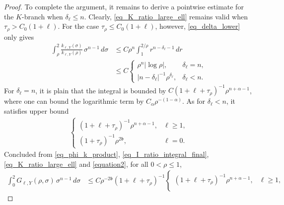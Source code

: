 \documentclass[12pt]{amsart}
\begin{document}
\begin{proof}
To complete the argument, it remains to derive a pointwise estimate for the $K$-branch when $\delta_\ell \le n$. Clearly, \eqref{eq_K_ratio_large_ell} remains valid when $\tau_\rho > C_0(1+\ell)$. For the case $\tau_\rho \le C_0(1+\ell)$, however, \eqref{eq_delta_lower} only gives
\begin{align*}
    \int_\rho^2 \frac{k_{\ell,Y}(\sigma)}{k_{\ell,Y}(\rho)} \, \sigma^{n-1} \, d\sigma
    &\le C \rho^n \int_1^{2/\rho} r^{n-\delta_\ell-1}\,dr\\
    &\le C \begin{cases}
        \rho^n |\log{\rho}|, & \delta_\ell = n,\\
        |n-\delta_\ell|^{-1} \rho^{\delta_\ell}, & \delta_\ell < n.
    \end{cases}
\end{align*}
For $\delta_\ell=n$, it is plain that the integral is bounded by $C(1+\ell+\tau_\rho)^{-1} \rho^{n+\alpha-1}$, where one can bound the logarithmic term by $C_\alpha \rho^{-(1-\alpha)}$. As for $\delta_\ell<n$, it satisfies upper bound
\begin{align}\label{equation2}
    \begin{cases}
        (1+\ell+\tau_\rho)^{-1} \rho^{n+\alpha-1}, & \ell \ge 1,\\
        (1+\tau_\rho)^{-1} \rho^{2\mathfrak b}, & \ell=0.
    \end{cases}
\end{align}
Concluded from \eqref{eq_phi_k_product}, \eqref{eq_I_ratio_integral_final}, \eqref{eq_K_ratio_large_ell} and \eqref{equation2}, for all $0<\rho \le 1$,
\begin{align*}
    \int_0^2
        G_{\ell,Y}(\rho,\sigma)
    \, \sigma^{n-1} \, d\sigma
    &\le C \rho^{-2 \mathfrak b} (1+\ell+\tau_\rho)^{-1} \begin{cases}
        (1+\ell+\tau_\rho)^{-1} \rho^{n+\alpha-1}, & \ell \ge 1,\\

\end{cases}
\end{align*}
\end{proof}
\end{document}
